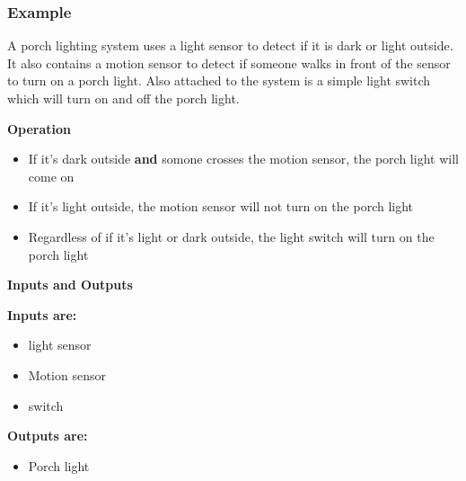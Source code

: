 \documentclass[a4paper,12pt]{article}
\newenvironment{6mini}{
  \begin{minipage}{6cm}
}{
  \end{minipage}
}
\begin{document}
        \subsubsection*{Example}
            A porch lighting system uses a light sensor to detect if it is dark or light outside. It also contains a motion sensor to detect if someone walks in front of the sensor to turn on a porch light. Also
            attached to the system is a simple light switch which will turn on and off the porch light.
            \begin{center}\textbf{Operation}\end{center}
                \begin{itemize}
                    \item If it's dark outside \textbf{and} somone crosses the motion sensor, the porch light will come on
                    \item If it's light outside, the motion sensor will not turn on the porch light
                    \item Regardless of if it's light or dark outside, the light switch will turn on the porch light
                \end{itemize}
            
            \begin{center}\textbf{Inputs and Outputs}\end{center}
                \begin{6mini}
                    \textbf{Inputs are:}
                    \begin{itemize}
                        \item light sensor
                        \item Motion sensor
                        \item switch
                    \end{itemize}
                \end{6mini}
                \begin{6mini} \vspace{6pt}
                    \textbf{Outputs are:}
                    \begin{itemize}
                        \item Porch light
                    \end{itemize}
                \end{6mini}
\end{document}

